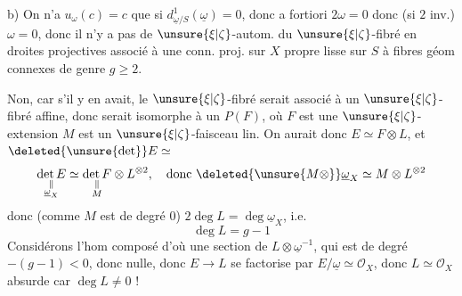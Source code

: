 b) On n'a $u_\omega(c)=c$ que si $d^1_{\underline{\omega}/S}(\underline{\omega})=0$, donc a fortiori $2\omega=0$ donc (si $2$ inv.) $\omega=0$, donc il n'y a pas de $\unsure{\xi|\zeta}$-autom. du \deleted{$\unsure{\xi}$} $\unsure{\xi|\zeta}$-fibré en droites projectives associé à une conn. proj. sur $X$ propre lisse sur $S$ à fibres géom connexes de genre $g\geq2$.



Non, car s'il y en avait, le $\unsure{\xi|\zeta}$-fibré serait associé à un $\unsure{\xi|\zeta}$-fibré affine, donc serait isomorphe à un $P(F)$, où $F$ est une $\unsure{\xi|\zeta}$-extension
$M$ est un $\unsure{\xi|\zeta}$-faisceau lin. On aurait donc $E\simeq F\otimes L$, et $\deleted{\unsure{\det}}E\simeq$
\[
\underset{\substack{\Vert\\\underline{\omega}_X}}{\det E}
\simeq \underset{\substack{\Vert\\M}}{\det F}\otimes L^{\otimes2},
\quad\text{donc }\deleted{\unsure{M\otimes}}\underline{\omega}_X\simeq M\otimes L^{\otimes2}
\]
donc (comme $M$ est de degré $0$) $2\deg L=\deg\underline{\omega}_X$, i.e. 
\[
\deg L=g-1
\]
Considérons l'hom composé
d'où une section de $L\otimes\underline{\omega}^{-1}$, qui est de degré $-(g-1)<0$, donc  nulle, donc  $E\to L$ se factorise par $E/\underline{\omega}\simeq\mathcal O_X$, donc $L\simeq\mathcal O_X$ absurde car $\deg L\ne0$ !

